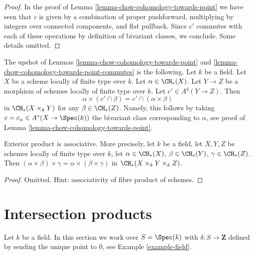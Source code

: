 \begin{proof}
In the proof of Lemma \ref{lemma-chow-cohomology-towards-point}
we have seen that $c$ is given by a combination of
proper pushforward, multiplying by integers over connected
components, and flat pullback. Since $c'$ commutes with each of
these operations by definition of bivariant classes, we conclude.
Some details omitted.
\end{proof}

\begin{remark}
\label{remark-commuting-exterior}
The upshot of Lemmas \ref{lemma-chow-cohomology-towards-point}
and \ref{lemma-chow-cohomology-towards-point-commutes} is the following.
Let $k$ be a field. Let $X$ be a scheme locally of finite type over $k$.
Let $\alpha \in \CH_*(X)$. Let $Y \to Z$ be a morphism of schemes
locally of finite type over $k$. Let $c' \in A^q(Y \to Z)$. Then
$$
\alpha \times (c' \cap \beta) = c' \cap (\alpha \times \beta)
$$
in $\CH_*(X \times_k Y)$ for any $\beta \in \CH_*(Z)$. Namely, this
follows by taking $c = c_\alpha \in A^*(X \to \Spec(k))$ the bivariant class
corresponding to $\alpha$, see proof of
Lemma \ref{lemma-chow-cohomology-towards-point}.
\end{remark}

\begin{lemma}
\label{lemma-exterior-product-associative}
Exterior product is associative. More precisely, let $k$ be a field,
let $X, Y, Z$ be schemes locally of finite type over $k$, let
$\alpha \in \CH_*(X)$, $\beta \in \CH_*(Y)$, $\gamma \in \CH_*(Z)$.
Then $(\alpha \times \beta) \times \gamma =
\alpha \times (\beta \times \gamma)$ in $\CH_*(X \times_k Y \times_k Z)$.
\end{lemma}

\begin{proof}
Omitted. Hint: associativity of fibre product of schemes.
\end{proof}







\section{Intersection products}
\label{section-intersection-product}

\noindent
Let $k$ be a field. In this section we work over $S = \Spec(k)$ with
$\delta : S \to \mathbf{Z}$ defined by sending the unique point to $0$, see
Example \ref{example-field}.

